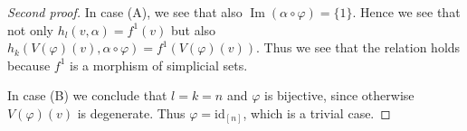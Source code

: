 \documentclass{amsart}
\theoremstyle{plain}
\theoremstyle{definition}
\theoremstyle{remark}
\numberwithin{equation}{subsection}
\def\Im{\mathop{\mathrm{Im}}}
\begin{document}
\begin{proof}[Second proof]
\medskip\noindent
In case (A), we see that also $\Im(\alpha \circ \varphi) = \{1\}$.
Hence we see that not only $h_l(v, \alpha) = f^1(v)$ but also
$h_k(V(\varphi)(v), \alpha \circ \varphi) = f^1(V(\varphi)(v))$.
Thus we see that the relation holds because $f^1$ is a morphism
of simplicial sets.

\medskip\noindent
In case (B) we conclude that $l = k = n$ and
$\varphi$ is bijective, since otherwise $V(\varphi)(v)$
is degenerate. Thus $\varphi = \text{id}_{[n]}$, which is a trivial case.
\end{proof}
\end{document}
